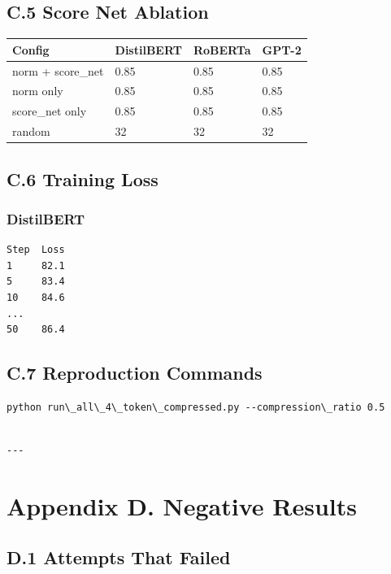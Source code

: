 \subsection{C.5 Score Net Ablation}

\begin{table}[H]
\centering
\small
\begin{tabular}{llll}
\toprule
\textbf{Config} & \textbf{DistilBERT} & \textbf{RoBERTa} & \textbf{GPT-2} \\
\midrule
norm + score\_net & 0.85 & 0.85 & 0.85 \\
norm only & 0.85 & 0.85 & 0.85 \\
score\_net only & 0.85 & 0.85 & 0.85 \\
random & 32 & 32 & 32 \\
\bottomrule
\end{tabular}
\end{table}

\subsection{C.6 Training Loss}

\subsubsection{DistilBERT}
\begin{lstlisting}
Step  Loss
1     82.1
5     83.4
10    84.6
...
50    86.4
\end{lstlisting}

\subsection{C.7 Reproduction Commands}

\begin{lstlisting}
python run\_all\_4\_token\_compressed.py --compression\_ratio 0.5
\end{lstlisting}
\begin{lstlisting}

---
\end{lstlisting}

\section{Appendix D. Negative Results}

\subsection{D.1 Attempts That Failed}

